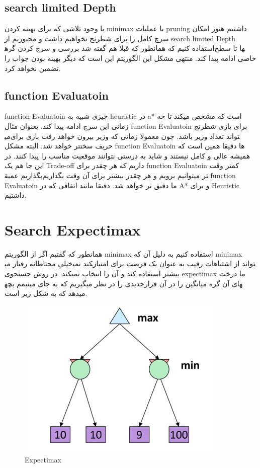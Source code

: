 \subsection{search limited Depth}
با وجود تلاشی که برای بهینه کردن minimax با عملیات pruning داشتیم هنوز امکان سرچ کامل را برای شطرنج نخواهیم داشت و مجبوریم از search limited Depth استفاده کنیم که همانطور که قبلا هم گفته شد بررسی و سرچ کردن گره‎ها تا سطح خاصی ادامه پیدا کند. منتهی مشکل این الگوریتم این است که دیگر بهینه بودن جواب را تضمین نخواهد کرد.

\subsection{function Evaluatoin}
function Evaluatoin چیزی شبیه به heuristic در a* است که مشخص میکند تا چه زمانی این سرچ ادامه پیدا کند. بعنوان مثال function Evaluatoin  برای بازی شطرنج می‎تواند تعداد وزیر باشد. چون معمولا زمانی که وزیر بیرون خواهد رفت بازی برای حریف سختتر خواهد شد. البته مشکل function Evaluatoin ها دقیقا همین است که همیشه عالی و کامل نیستند و شاید به درستی نتوانند موقعیت مناسب را پیدا کنند. در این جا هم یک Trade-off داریم که هر چقدر برای function Evaluatoin کمتر وقت بگذاریم عمیق‎تر میتوانیم برویم و هر چقدر بیشتر برای آن وقت بگذاریم function Evaluatoin ما دقیق تر خواهد شد. دقیقا مانند اتفاقی که در A* و برای Heuristic داشتیم.


\section{Search Expectimax}
همانطور که گفتیم اگر از الگوریتم minimax استفاده کنیم به دلیل آن که minimax خیلی محتاطانه رفتار می‎کند نمی‎تواند از اشتباهات رقیب به عنوان یک فرصت برای امتیاز بیشتر استفاده کند و آن را انتخاب نمیکند.
در روش جستجوی expectimax ما درخت جدیدی را در نظر میگیریم که به جای مینیمم بچه‎های آن گره میانگین را در آن قرار میدهد که به شکل زیر است.


\begin{figure}[h!]
    \centering
    \includegraphics[width=0.4\linewidth]{images/expectimax01.jpg}
    \caption{Expectimax}
\end{figure}


